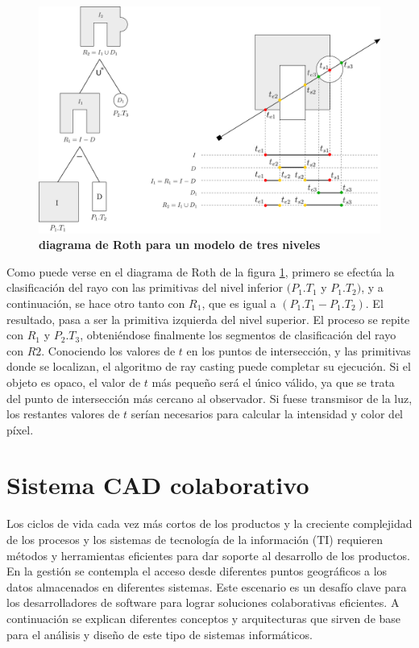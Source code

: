 \begin{figure}[!]
\includegraphics[width=15cm]{Img/GEO/ray3.png}
\centering
\caption{\textbf{\footnotesize{diagrama de Roth para un modelo de tres niveles}}}
\label{fig:visual3}
\end{figure}

Como puede verse en el diagrama de Roth de la figura \ref{fig:visual3}, primero se efectúa la clasificación del rayo con las primitivas del nivel inferior $(P_1.T_1$ y $P_1.T_2)$, y a continuación, se hace otro tanto con $R_1$, que es igual a $(P_1.T_1 - P_1.T_2)$. El resultado, pasa a ser la primitiva izquierda del nivel superior. El proceso se repite con $R_1$ y $P_2.T_3$, obteniéndose finalmente los segmentos de clasificación del rayo con $R2$. Conociendo los valores de $t$ en los puntos de intersección, y las primitivas donde se localizan, el algoritmo de ray casting puede completar su ejecución. Si el objeto es opaco, el valor de $t$ más pequeño será el único válido, ya que se trata del punto de intersección más cercano al observador. Si fuese transmisor de la luz, los restantes valores de $t$ serían necesarios para calcular la intensidad y color del píxel.


\clearpage



\section{Sistema CAD colaborativo}

Los ciclos de vida cada vez más cortos de los productos y la creciente complejidad de los procesos y los sistemas de tecnología de la información (TI) requieren métodos y herramientas eficientes para dar soporte al desarrollo de los productos. En la gestión se contempla el acceso desde diferentes puntos geográficos a los datos almacenados en diferentes sistemas. Este escenario es un desafío clave para los desarrolladores de software para lograr soluciones colaborativas eficientes. A continuación se explican diferentes conceptos y arquitecturas que sirven de base para el análisis y diseño de este tipo de sistemas informáticos.


